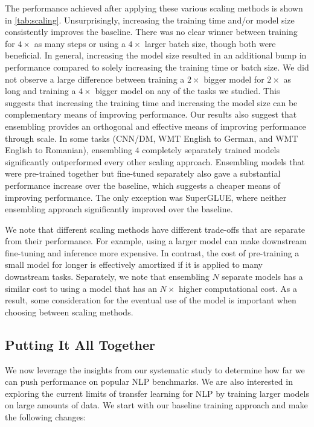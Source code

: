 \documentclass[twoside,11pt]{article}
\begin{document}
The performance achieved after applying these various scaling methods is shown in \cref{tab:scaling}.
Unsurprisingly, increasing the training time and/or model size consistently improves the baseline.
There was no clear winner between training for $4\times$ as many steps or using a $4\times$ larger batch size, though both were beneficial.
In general, increasing the model size resulted in an additional bump in performance compared to solely increasing the training time or batch size.
We did not observe a large difference between training a $2\times$ bigger model for $2\times$ as long and training a $4\times$ bigger model on any of the tasks we studied.
This suggests that increasing the training time and increasing the model size can be complementary means of improving performance.
Our results also suggest that ensembling provides an orthogonal and effective means of improving performance through scale.
In some tasks (CNN/DM, WMT English to German, and WMT English to Romanian), ensembling $4$ completely separately trained models significantly outperformed every other scaling approach.
Ensembling models that were pre-trained together but fine-tuned separately also gave a substantial performance increase over the baseline, which suggests a cheaper means of improving performance.
The only exception was SuperGLUE, where neither ensembling approach significantly improved over the baseline.

We note that different scaling methods have different trade-offs that are separate from their performance.
For example, using a larger model can make downstream fine-tuning and inference more expensive.
In contrast, the cost of pre-training a small model for longer is effectively amortized if it is applied to many downstream tasks.
Separately, we note that ensembling $N$ separate models has a similar cost to using a model that has an $N\times$ higher computational cost.
As a result, some consideration for the eventual use of the model is important when choosing between scaling methods.

\subsection{Putting It All Together}
\label{sec:together}

We now leverage the insights from our systematic study to determine how far we can push performance on popular NLP benchmarks.
We are also interested in exploring the current limits of transfer learning for NLP by training larger models on large amounts of data.
We start with our baseline training approach and make the following changes:
\end{document}
